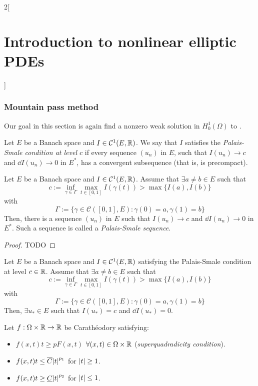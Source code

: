 \documentclass[../../../main_math.tex]{subfiles}
\begin{document}
\begin{multicols}{2}[\section{Introduction to nonlinear elliptic PDEs}]
  \subsubsection{Mountain pass method}
  Our goal in this section is again find a nonzero weak solution in $H_0^1(\Omega)$ to .
  \begin{definition}
    Let $E$ be a Banach space and $I\in\mathcal{C}^1(E,\mathbb{R})$. We say that $I$ satisfies the \emph{Palais-Smale condition at level $c$} if every sequence $(u_n)$ in $E$, such that $I(u_n)\to c$ and $\dd{I(u_n)}\to 0$ in $E^*$, has a convergent subsequence (that is, is precompact).
  \end{definition}
  \begin{theorem}
    Let $E$ be a Banach space and $I\in\mathcal{C}^1(E,\mathbb{R})$. Assume that $\exists a\ne b\in E$ such that
    $$
      c:=\inf_{\gamma\in \Gamma}\max_{t\in [0,1]}I(\gamma(t))>\max\{I(a),I(b)\}
    $$
    with $$
      \Gamma:=\{\gamma\in \mathcal{C}([0,1],E):\gamma(0)=a,\gamma(1)=b\}
    $$
    Then, there is a sequence $(u_n)$ in $E$ such that $I(u_n)\to c$ and $\dd{I(u_n)}\to 0$ in $E^*$. Such a sequence is called a \emph{Palais-Smale sequence}.
  \end{theorem}
  \begin{proof}
    TODO
  \end{proof}
  \begin{corollary}
    Let $E$ be a Banach space and $I\in\mathcal{C}^1(E,\mathbb{R})$ satisfying the Palais-Smale condition at level $c\in\mathbb{R}$. Assume that $\exists a\ne b\in E$ such that
    $$
      c:=\inf_{\gamma\in \Gamma}\max_{t\in [0,1]}I(\gamma(t))>\max\{I(a),I(b)\}
    $$
    with $$
      \Gamma:=\{\gamma\in \mathcal{C}([0,1],E):\gamma(0)=a,\gamma(1)=b\}
    $$
    Then, $\exists u_*\in E$ such that $I(u_*)=c$ and $\dd{I(u_*)}=0$.
  \end{corollary}
  \begin{proposition}
    Let $f:\Omega\times \mathbb{R}\to\mathbb{R}$ be Carathéodory satisfying:
    \begin{itemize}
      \item $f(x,t)t\geq p F(x,t)$ $\forall (x,t)\in \Omega\times \mathbb{R}$ (\emph{superquadradicity condition}).
      \item $f(x,t)t\leq \overline{C}\abs{t}^{p_1}$ for $\abs{t}\geq 1$.
      \item $f(x,t)t\geq \underline{C} \abs{t}^{p_2}$ for $\abs{t}\leq 1$.
    \end{itemize}

\end{proposition}
\end{multicols}
\end{document}
